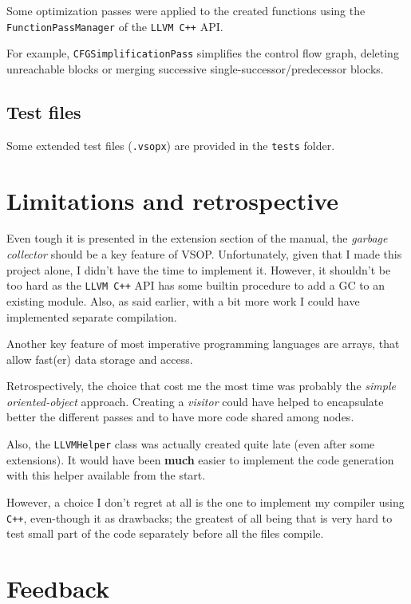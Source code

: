 \documentclass[a4paper, 12pt]{article}
\begin{document}
	Some optimization passes were applied to the created functions using the \texttt{FunctionPassManager} of the \texttt{LLVM C++} API.
	
    For example, \texttt{CFGSimplificationPass} simplifies the control flow graph, deleting unreachable blocks or merging successive single-successor/predecessor blocks.
	
	\subsection{Test files}
	
	Some extended test files (\texttt{.vsopx}) are provided in the \texttt{tests} folder.
	
	\section{Limitations and retrospective}
	
	Even tough it is presented in the extension section of the manual, the \emph{garbage collector} should be a key feature of VSOP. Unfortunately, given that I made this project alone, I didn't have the time to implement it. However, it shouldn't be too hard as the \texttt{LLVM C++} API has some builtin procedure to add a GC to an existing module. Also, as said earlier, with a bit more work I could have implemented separate compilation.
	
	Another key feature of most imperative programming languages are arrays, that allow fast(er) data storage and access.
	
	Retrospectively, the choice that cost me the most time was probably the \emph{simple oriented-object} approach. Creating a \emph{visitor} could have helped to encapsulate better the different passes and to have more code shared among nodes.
	
	Also, the \texttt{LLVMHelper} class was actually created quite late (even after some extensions). It would have been \textbf{much} easier to implement the code generation with this helper available from the start.
	
	However, a choice I don't regret at all is the one to implement my compiler using \texttt{C++}, even-though it as drawbacks; the greatest of all being that is very hard to test small part of the code separately before all the files compile.
	
	\section{Feedback}
	
\end{document}
